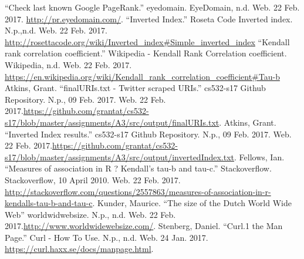 \documentclass[letterpaper,11pt]{article}
\begin{document}
\clearpage

\begin{thebibliography}{9}
``Check last known Google PageRank.'' eyedomain. EyeDomain, n.d. Web. 22 Feb. 2017. \url{http://pr.eyedomain.com/}.
``Inverted Index.'' Roseta Code Inverted index. N.p.,n.d. Web. 22 Feb. 2017. \url{http://rosettacode.org/wiki/Inverted_index#Simple_inverted_index}
``Kendall rank correlation coefficient.'' Wikipedia - Kendall Rank Correlation coefficient. Wikipedia, n.d. Web. 22 Feb. 2017. \url{https://en.wikipedia.org/wiki/Kendall_rank_correlation_coefficient#Tau-b}
Atkins, Grant. ``finalURIs.txt - Twitter scraped URIs.'' cs532-s17 Github Repository. N.p., 09 Feb. 2017. Web. 22 Feb. 2017.\url{https://github.com/grantat/cs532-s17/blob/master/assignments/A3/src/output/finalURIs.txt}.
Atkins, Grant. ``Inverted Index results.'' cs532-s17 Github Repository. N.p., 09 Feb. 2017. Web. 22 Feb. 2017.\url{https://github.com/grantat/cs532-s17/blob/master/assignments/A3/src/output/invertedIndex.txt}.
Fellows, Ian. ``Measures of association in R ? Kendall's tau-b and tau-c.'' Stackoverflow. Stackoverflow, 10 April 2010. Web. 22 Feb. 2017. \url{http://stackoverflow.com/questions/2557863/measures-of-association-in-r-kendalls-tau-b-and-tau-c}.
Kunder, Maurice. ``The size of the Dutch World Wide Web'' worldwidwebsize. N.p., n.d. Web. 22 Feb. 2017.\url{http://www.worldwidewebsize.com/}.
Stenberg, Daniel. ``Curl.1 the Man Page.'' Curl - How To Use. N.p., n.d. Web. 24 Jan. 2017. \url{https://curl.haxx.se/docs/manpage.html}.
\end{thebibliography}
\end{document}

